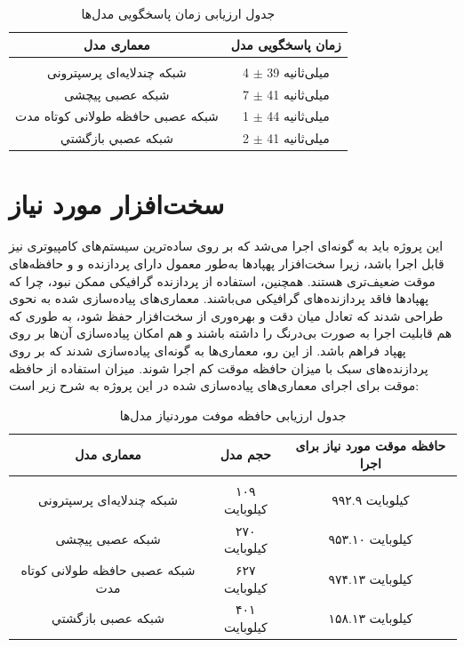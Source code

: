 \begin{table}[h!]
    \centering
    \begin{tabular}{||c c||}
     \hline
     \rule{0pt}{3ex}معماری مدل & زمان پاسخگویی مدل\\ [1.5ex]
     \hline
     \hline
     \rule{0pt}{0.5ex} & \\  %
     شبکه چندلایه‌ای پرسپترونی & 4 $\pm$ 39 میلی‌ثانیه \\ [2.5ex]
     شبکه عصبی پیچشی & 7 $\pm$ 41 میلی‌ثانیه  \\ [2.5ex]
     شبکه عصبی  حافظه طولانی کوتاه مدت & 1 $\pm$ 44 میلی‌ثانیه  \\ [2.5ex]
     شبكه عصبي بازگشتي & 2 $\pm$ 41 میلی‌ثانیه  \\ [2.5ex]

     \hline
    \end{tabular}
    \caption{جدول ارزیابی زمان پاسخگویی مدل‌ها}
    \label{table:1}
\end{table}


\section{سخت‌افزار مورد نیاز}
این پروژه باید به گونه‌ای اجرا می‌شد که بر روی ساده‌ترین سیستم‌های کامپیوتری نیز قابل اجرا باشد، زیرا سخت‌افزار پهپادها به‌طور معمول دارای پردازنده‌ و و حافظه‌های موقت 
ضعیف‌تری هستند. همچنین، استفاده از پردازنده گرافیکی ممکن نبود، چرا که پهپادها فاقد پردازنده‌های گرافیکی می‌باشند. 
معماری‌های پیاده‌سازی شده به نحوی طراحی شدند که تعادل میان دقت و بهره‌وری از سخت‌افزار حفظ شود، به طوری که هم قابلیت اجرا به صورت بی‌درنگ را داشته باشند و هم امکان پیاده‌سازی آن‌ها بر روی پهپاد فراهم باشد. از این رو، معماری‌ها به گونه‌ای پیاده‌سازی شدند که بر روی پردازنده‌های سبک با میزان حافظه موقت کم اجرا شوند.
میزان استفاده از حافظه موقت برای اجرای معماری‌های پیاده‌سازی شده در این پروژه به شرح زیر است:



\begin{table}[h!]
    \centering
    \begin{tabular}{||c c c||}
     \hline
     \rule{0pt}{3ex}معماری مدل & حجم مدل & حافظه موقت مورد نیاز برای اجرا \\ [1.5ex]
     \hline
     \hline
     \rule{0pt}{0.5ex} & & \\  %
     شبکه چندلایه‌ای پرسپترونی & ۱۰۹ کیلوبایت & ۹۹۲.۹ کیلوبایت \\ [2.5ex]
     شبکه عصبی پیچشی & ۲۷۰ کیلوبایت & ۹۵۳.۱۰ کیلوبایت \\ [2.5ex]
     شبکه عصبی  حافظه طولانی کوتاه مدت & ۶۲۷ کیلوبایت & ۹۷۴.۱۳ کیلوبایت \\ [2.5ex]
     شبکه عصبی بازگشتي & ۴۰۱ کیلوبایت & ۱۵۸.۱۳ کیلوبایت \\ [2.5ex]
     \hline
    \end{tabular}
    \caption{جدول ارزیابی حافظه موفت موردنیاز مدل‌ها}
    \label{table:4}
\end{table}

